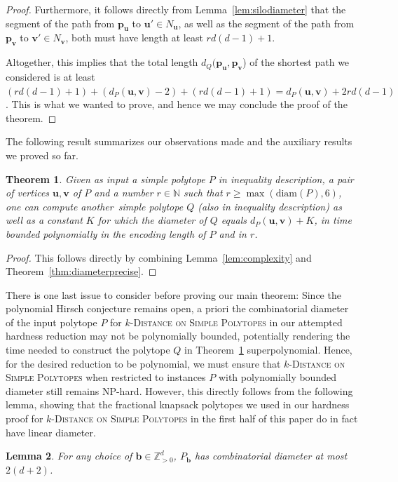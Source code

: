 \documentclass[centering,11pt,reqno]{amsart}
\newtheorem{theorem}{Theorem}[section]
\newtheorem{lem}[theorem]{Lemma}
\theoremstyle{definition}
\newcommand{\NP}{\textsc{NP}}
\begin{document}
\begin{proof}
Furthermore, it follows directly from Lemma~\ref{lem:silodiameter} that the segment of the path from $\mathbf{p}_\mathbf{u}$ to $\mathbf{u}'\in N_\mathbf{u}$, as well as the segment of the path from $\mathbf{p}_\mathbf{v}$ to $\mathbf{v}'\in N_\mathbf{v}$, both must have length at least $rd(d-1)+1$.

Altogether, this implies that
the total length $d_Q(\mathbf{p}_\mathbf{u},\mathbf{p}_\mathbf{v}$) of the shortest path we considered is at least $(rd(d-1)+1)+(d_P(\mathbf{u},\mathbf{v})-2)+(rd(d-1)+1)=d_P(\mathbf{u},\mathbf{v})+2rd(d-1)$. This is what we wanted to prove, and hence we may conclude the proof of the theorem.
\end{proof}

The following result summarizes our observations made and the auxiliary results we proved so far.

\begin{theorem}
\label{thm:Reduction}
Given as input a simple polytope $P$ in inequality description, a pair of vertices $\mathbf{u}, \mathbf{v}$ of $P$ and a number $r\in \mathbb{N}$ such that $r\ge \max(\mathrm{diam}(P),6)$, one can compute another~simple polytope $Q$ (also in inequality description) as well as a constant $K$ for which the diameter of $Q$ equals $d_P(\mathbf{u}, \mathbf{v}) + K$, in time bounded polynomially in the encoding length of $P$ and in $r$. 
\end{theorem}
\begin{proof}
This follows directly by combining Lemma~\ref{lem:complexity} and Theorem~\ref{thm:diameterprecise}.
\end{proof}

There is one last issue to consider before proving our main theorem: Since the polynomial Hirsch conjecture remains open, a priori the combinatorial diameter of the input polytope $P$ for \textsc{$k$-Distance on Simple Polytopes} in our attempted hardness reduction may not be polynomially bounded, potentially rendering the time needed to construct the polytope $Q$ in Theorem~\ref{thm:Reduction} superpolynomial. Hence, for the desired reduction to be polynomial, we must ensure that \textsc{$k$-Distance on Simple Polytopes} when restricted to instances $P$ with polynomially bounded diameter still remains \NP-hard. However, this directly follows from the following lemma, showing that the fractional knapsack polytopes we used in our hardness proof for \textsc{$k$-Distance on Simple Polytopes} in the first half of this paper do in fact have linear diameter.
\begin{lem}
\label{lem:knapsackdiameter}
For any choice of $\mathbf{b} \in \mathbb{Z}^{d}_{>0}$, $P_{\mathbf{b}}$ has combinatorial diameter at most $2(d+2)$.
\end{lem}
\end{document}
